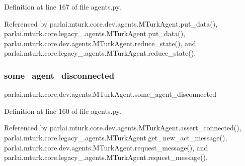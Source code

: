 Definition at line 167 of file agents.\+py.



Referenced by parlai.\+mturk.\+core.\+dev.\+agents.\+M\+Turk\+Agent.\+put\+\_\+data(), parlai.\+mturk.\+core.\+legacy\+\_.\+agents.\+M\+Turk\+Agent.\+put\+\_\+data(), parlai.\+mturk.\+core.\+dev.\+agents.\+M\+Turk\+Agent.\+reduce\+\_\+state(), and parlai.\+mturk.\+core.\+legacy\+\_.\+agents.\+M\+Turk\+Agent.\+reduce\+\_\+state().

\mbox{\label{classparlai_1_1mturk_1_1core_1_1dev_1_1agents_1_1MTurkAgent_afb5229fd0ede69f2b1f75ae267903be5}} 
\subsubsection{\texorpdfstring{some\+\_\+agent\+\_\+disconnected}{some\_agent\_disconnected}}
{\footnotesize\ttfamily parlai.\+mturk.\+core.\+dev.\+agents.\+M\+Turk\+Agent.\+some\+\_\+agent\+\_\+disconnected}



Definition at line 160 of file agents.\+py.



Referenced by parlai.\+mturk.\+core.\+dev.\+agents.\+M\+Turk\+Agent.\+assert\+\_\+connected(), parlai.\+mturk.\+core.\+legacy\+\_.\+agents.\+M\+Turk\+Agent.\+get\+\_\+new\+\_\+act\+\_\+message(), parlai.\+mturk.\+core.\+dev.\+agents.\+M\+Turk\+Agent.\+request\+\_\+message(), and parlai.\+mturk.\+core.\+legacy\+\_.\+agents.\+M\+Turk\+Agent.\+request\+\_\+message().

\mbox{\label{classparlai_1_1mturk_1_1core_1_1dev_1_1agents_1_1MTurkAgent_aab7f4a45911da3d5aeaadbff0aff420e}} 
